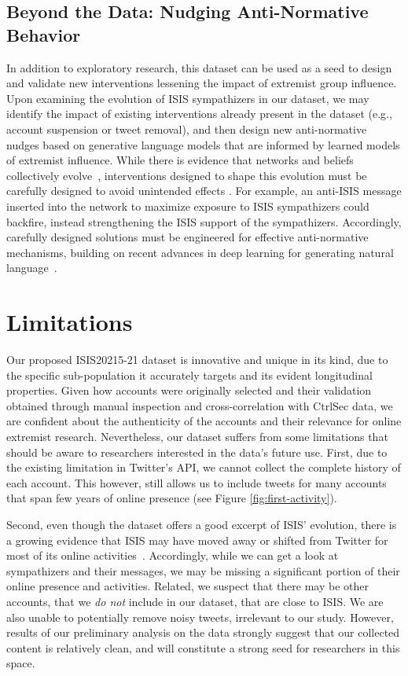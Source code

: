 \documentclass[letterpaper]{article} %
\begin{document}
 \subsection{Beyond the Data: Nudging Anti-Normative Behavior}
In addition to exploratory research, this dataset can be used as a seed  to design and validate new interventions lessening the impact of extremist group influence. Upon  examining the evolution of ISIS sympathizers in our dataset,  we may  identify the impact of existing interventions already present in the dataset (e.g., account suspension or tweet removal), and then design new anti-normative nudges based on generative language models that are informed by learned models of extremist influence. 
While there is evidence that networks and beliefs collectively evolve~\cite{lazer2010coevolution}, interventions designed to shape this evolution must be carefully designed to avoid unintended effects  \cite{Bail9216,nyhan2010corrections}.  For example, an anti-ISIS message  inserted into the network to maximize exposure to ISIS sympathizers could backfire, instead strengthening the ISIS support of the sympathizers. Accordingly, carefully designed solutions must be engineered for effective  anti-normative mechanisms, building on recent advances in deep learning for generating natural language~\cite{DBLP:journals/corr/BowmanVVDJB15,DBLP:journals/corr/abs-1708-02709}.


\section{Limitations}
Our proposed ISIS20215-21 dataset  is innovative and unique in its kind, due to the specific sub-population it accurately targets and its evident longitudinal properties. Given how accounts were originally selected and their validation obtained through manual inspection and cross-correlation with CtrlSec data, we are confident about the authenticity of the accounts and their relevance for online extremist research.
Nevertheless, our dataset suffers from some limitations that should be aware to researchers interested in the data's future use.  First,  due to the existing limitation in Twitter's API, we cannot collect the complete history of each account. This however, still allows us  to include tweets for many accounts that span few years of online presence (see Figure \ref{fig:first-activity}).

Second,  even though the dataset offers a good excerpt of ISIS' evolution, there is a growing evidence that ISIS may have moved away or shifted  from Twitter for most of its online activities~\cite{voxpol}. Accordingly, while we can get a look at sympathizers and their messages, we may be missing a significant portion of their online presence and activities. Related, we suspect that there may be  other  accounts, that we \textit{do not }include in our dataset, that are close to ISIS.  We are also unable to potentially remove noisy tweets, irrelevant to our study. However, results of our preliminary analysis on the data strongly suggest that our collected content is relatively clean, and  will constitute a strong  seed    for researchers in this space.  
\end{document}

